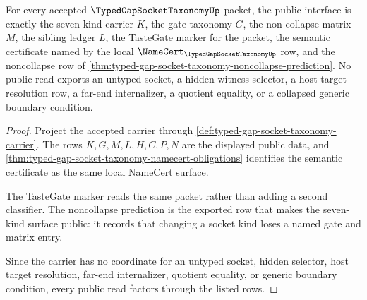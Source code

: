 \begin{theorem}
\label{thm:typed-gap-socket-taxonomy-public-export}
For every accepted $\TypedGapSocketTaxonomyUp$ packet, the public interface is exactly the seven-kind carrier $K$, the gate taxonomy $G$, the non-collapse matrix $M$, the sibling ledger $L$, the TasteGate marker for the packet, the semantic certificate named by the local $\NameCert_{\TypedGapSocketTaxonomyUp}$ row, and the noncollapse row of \autoref{thm:typed-gap-socket-taxonomy-noncollapse-prediction}. No public read exports an untyped socket, a hidden witness selector, a host target-resolution row, a far-end internalizer, a quotient equality, or a collapsed generic boundary condition.
\end{theorem}
\begin{proof}
Project the accepted carrier through \autoref{def:typed-gap-socket-taxonomy-carrier}. The rows $K,G,M,L,H,C,P,N$ are the displayed public data, and \autoref{thm:typed-gap-socket-taxonomy-namecert-obligations} identifies the semantic certificate as the same local NameCert surface.

The TasteGate marker reads the same packet rather than adding a second classifier. The noncollapse prediction is the exported row that makes the seven-kind surface public: it records that changing a socket kind loses a named gate and matrix entry.

Since the carrier has no coordinate for an untyped socket, hidden selector, host target resolution, far-end internalizer, quotient equality, or generic boundary condition, every public read factors through the listed rows.
\end{proof}

